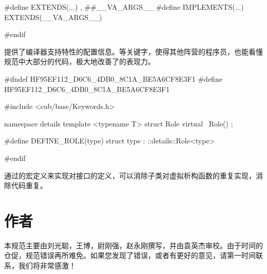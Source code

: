 \begin{content}
\begin{leftbar}
\begin{c++}[caption={\ttfamily{cub/base/Keywords.h}}]
#define EXTENDS(...) , ##__VA_ARGS__
#define IMPLEMENTS(...) EXTENDS(__VA_ARGS__)

#endif
\end{c++}
\end{leftbar}

提供了编译器支持特性的配置信息。等关键字，使得其他阵营的程序员，也能看懂规范中大部分的代码，极大地改善了的表现力。

\begin{leftbar}
\begin{c++}[caption={\ttfamily{cub/base/Role.h}}]
#ifndef HF95EF112_D6C6_4DB0_8C1A_BE5A6CF8E3F1
#define HF95EF112_D6C6_4DB0_8C1A_BE5A6CF8E3F1

#include <cub/base/Keywords.h>

namespace details
{
   template <typename T>
   struct Role
   {
      virtual ~Role() {}
   };
}

#define DEFINE_ROLE(type) struct type : ::details::Role<type>

#endif
\end{c++}
\end{leftbar}

通过的宏定义来实现对接口的定义，可以消除子类对虚拟析构函数的重复实现，消除代码重复。

\end{content}

\section*{作者}

\begin{content}

本规范主要由刘光聪，王博，尉刚强，赵永刚撰写，并由袁英杰审校。由于时间的仓促，规范错误再所难免。如果您发现了错误，或者有更好的意见，请第一时间联系，我们将非常感激！

\end{content}
